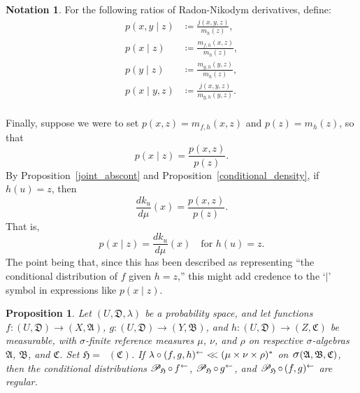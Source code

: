 \documentclass[
twoside=true,
paper=letter,
fontsize=9pt,
pagesize=auto,
leqno,
openany,
headsepline,
overfullrule,
]{scrbook}
\theoremstyle{plain}
\theoremstyle{plain}
\newtheorem{prop}[thm]{Proposition}
\theoremstyle{definition}
\newtheorem{notn}[thm]{Notation}
\theoremstyle{bfnoteitalic}
\theoremstyle{bfnoteroman}
\newcommand{\sigalg}[1]{\mathfrak{#1}}
\newcommand{\cali}[1]{\mathscr{#1}}
\newcommand{\definedby}{\coloneqq}
\newcommand{\condprobop}[1]{\mathop{\cali{P}\hspace{-1pt}}\nolimits_{#1}}
\newcommand{\sagb}{\mathop{\hbox{\large{$\sigma$}}}\nolimits}
\newcommand{\textsigma}{\hbox{\large{$\sigma$}}\kern-1pt}
\newcommand{\preimage}[1]{\mathop{#1^{\leftarrow}}}
\newcommand{\sigmaalgebra}{\sigalg{A}}
\newcommand{\sigmaalgebraii}{\sigalg{B}}
\newcommand{\sigmaalgebraiii}{\sigalg{C}}
\newcommand{\productsig}[2]{\sagb(#1,#2)}
\newcommand{\funcf}{f}
\newcommand{\funcg}{g}
\newcommand{\funch}{h}
\newcommand{\function}{f}
\newcommand{\functionii}{g}
\newcommand{\functioniii}{h}
\newcommand{\measurespace}{X}
\newcommand{\measurespaceii}{Y}
\newcommand{\measurespaceiii}{Z}
\newcommand{\mspaceelt}{x}
\newcommand{\mspaceeltii}{y}
\newcommand{\mspaceeltiii}{z}
\newcommand{\abscont}{\mathrel{< \kern-3.5pt <}}
\newcommand{\measure}{\mu}
\newcommand{\measmu}{\mu}
\newcommand{\measureii}{\nu}
\newcommand{\measureiii}{\lambda}
\newcommand{\measlambda}{\lambda}
\newcommand{\measureiv}{\rho}
\newcommand{\uspace}{U}%
\newcommand{\uspacesig}{\sigalg{D}}
\begin{document}
\begin{notn}
For the following ratios of Radon-Nikodym derivatives, define:
\begin{align*}
p(\mspaceelt,\mspaceeltii\mid\mspaceeltiii)
& \definedby
\frac{j(\mspaceelt,\mspaceeltii,\mspaceeltiii)}
{m_{\functioniii} (\mspaceeltiii)},
\\
p(\mspaceelt\mid\mspaceeltiii)
& \definedby
\frac{m_{\function,\functioniii}(\mspaceelt,\mspaceeltiii)}
{m_{\functioniii} (\mspaceeltiii)},
\\
p(\mspaceeltii\mid\mspaceeltiii)
& \definedby
\frac{m_{\functionii,\functioniii}(\mspaceeltii,\mspaceeltiii)}
{m_{\functioniii} (\mspaceeltiii)},
\\
p(\mspaceelt\mid \mspaceeltii,\mspaceeltiii)
& \definedby
\frac{ j( \mspaceelt, \mspaceeltii, \mspaceeltiii) }
{m_{\functionii, \functioniii} ( \mspaceeltii,\mspaceeltiii ) }.
\\
\end{align*}

Finally, suppose we were to set
$p(x,z) = m_{f,h}(x,z)$
and
$p(z) = m_h(z)$, so that
\[
p(x\mid z) =
\frac{p(x,z)}{p(z)}.
\]
By Proposition~\ref{joint_abscont} and Proposition~\ref{conditional_density},
if $h(u)=z$, then
\[
\frac{d k_u}{d \measmu}(x) = \frac{p(x,z)}{p(z)}.
\]
That is,
\[
p(x \mid z) = \frac{d k_u}{d \measmu}(x)
\quad
\text{for $h(u) = z$.}
\]
The point being that, since this has been described as representing
``the conditional distribution of $f$ given $h=z$,'' this might add credence to the `$\vert$' symbol in expressions like $p(x\mid z)$.
\end{notn}


\begin{prop}\label{abs_cont_reg}
Let
$(\uspace,\uspacesig,\measlambda)$
be a probability space, and let functions
$\function:(\uspace,\uspacesig)\to (\measurespace,\sigmaalgebra)$,
$\functionii:(\uspace,\uspacesig)\to (\measurespaceii,\sigmaalgebraii)$,
and
$\functioniii:(\uspace,\uspacesig)\to (\measurespaceiii,\sigmaalgebraiii)$
be measurable, with \textsigma-finite reference measures
$\measure$, $\measureii$, and $\measureiv$ on respective \textsigma-algebras
$\sigmaalgebra$, $\sigmaalgebraii$, and $\sigmaalgebraiii$.
Set $\sigalg{H}=\preimage{\funch}(\sigmaalgebraiii)$.
If
$\measureiii\circ\preimage{(\function,\functionii,\functioniii)}
\abscont
(\measure\times\measureii\times\measureiv)^*$ on
$\productsig{\sigmaalgebra}{\sigmaalgebraii,\sigmaalgebraiii}$,
then the conditional distributions
$\condprobop{\sigalg{H}}\circ \preimage{\funcf}$,
$\condprobop{\sigalg{H}}\circ \preimage{\funcg}$,
and
$\condprobop{\sigalg{H}} \circ \preimage{(\funcf,\funcg)}$
are regular.
\end{prop}
\end{document}
